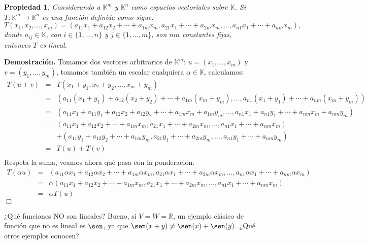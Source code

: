 \documentclass[12pt]{book}
\newtheorem{prop}{Propiedad}
\def\R{\mathbb{R}}
\def\K{\mathbb{K}}
\begin{document}
\begin{prop}
Considerando a $\K^m$ y $\K^n$ como espacios vectoriales sobre $\K$.
Si $T:\K^m\rightarrow \K^n$ es una función definida como sigue:
$$T(x_1,x_2,\dots,x_m)=(a_{11}x_1+a_{12}x_2+\cdots+a_{1m}x_m,a_{21}x_1+\cdots + a_{2m}x_m,\dots,a_{n1}x_1+\cdots + a_{nm}x_m),$$
donde $a_{ij}\in\K$, con $i\in\{1,\dots,n\}$ y $j\in\{1,\dots,m\}$, son $nm$ constantes  fijas, entonces $T$ es lineal.
\end{prop}
{\bf Demostración.} {\small
Tomamos dos vectores arbitrarios de $\K^m$: $u=(x_1,\dots,x_m)$ y $v=(y_1,\dots, y_m)$, tomamos también un escalar cualquiera $\alpha\in\K$, calculamos:
\begin{eqnarray*}
T(u+v)&=&T(x_1+y_1,x_2+y_2,\dots,x_m+y_m)\\
&=&(a_{11}(x_1+y_1)+a_{12}(x_2+y_2)+\cdots+a_{1m}(x_m+y_m),\dots,a_{n1}(x_1+y_1)+\cdots + a_{nm}(x_m+y_m))\\
&=&(a_{11}x_1+a_{11}y_1+a_{12}x_2+a_{12}y_2+\cdots+a_{1m}x_m+a_{1m}y_m,\dots,a_{n1}x_1+a_{n1}y_1+\cdots + a_{nm}x_m+a_{nm}y_m)\\
&=&(a_{11}x_1+a_{12}x_2+\cdots+a_{1m}x_m,a_{21}x_1+\cdots + a_{2m}x_m,\dots,a_{n1}x_1+\cdots + a_{nm}x_m)\\
&&+(a_{11}y_1+a_{12}y_2+\cdots+a_{1m}y_m,a_{21}y_1+\cdots + a_{2m}y_m,\dots,a_{n1}y_1+\cdots + a_{nm}y_m)\\
&=&T(u)+T(v)\\
\end{eqnarray*}
Respeta la suma, veamos ahora qué pasa con la ponderación.
\begin{eqnarray*}
T(\alpha u)&=&(a_{11}\alpha x_1+a_{12}\alpha x_2+\cdots+a_{1m}\alpha x_m,a_{21}\alpha x_1+\cdots + a_{2m}\alpha x_m,\dots,a_{n1}\alpha x_1+\cdots + a_{nm}\alpha x_m)\\
&=&\alpha (a_{11}x_1+a_{12}x_2+\cdots+a_{1m}x_m,a_{21}x_1+\cdots + a_{2m}x_m,\dots,a_{n1}x_1+\cdots + a_{nm}x_m)\\
&=&\alpha T(u)
\end{eqnarray*}}
\hfill $\Box$

¿Qué funciones NO son lineales? Bueno, si $V=W=\R$, un ejemplo clásico de función que no es lineal es $\sen$, ya que $\sen(x+y)\not = \sen(x)+\sen(y)$. ¿Qué otros ejemplos conocen?

\bigskip
\end{document}
